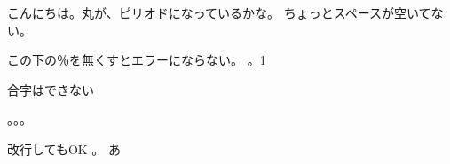 \documentclass[dvipdfmx,uplatex,a4j]{jsarticle}
\begin{document}
こんにちは。丸が、ピリオドになっているかな。
ちょっとスペースが空いてない。

この下の％を無くすとエラーにならない。
。1

合字はできない

。。。

改行してもOK
。
あ
\end{document}
